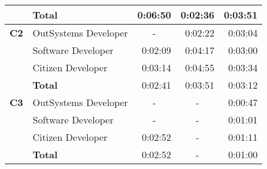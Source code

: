 \begin{table}[tb]
\begin{tabular}{llrcr}
                              & \textbf{Total}       & 0:06:50                                                           & \multicolumn{1}{r}{0:02:36}                                             & 0:03:51                                                       \\ \hline
    \textbf{C2}               & OutSystems Developer & \multicolumn{1}{c}{-}                                             & \multicolumn{1}{r}{0:02:22}                                             & 0:03:04                                                       \\
                              & Software Developer   & 0:02:09                                                           & \multicolumn{1}{r}{0:04:17}                                             & 0:03:00                                                       \\
                              & Citizen Developer    & 0:03:14                                                           & \multicolumn{1}{r}{0:04:55}                                             & 0:03:34                                                       \\
                              & \textbf{Total}       & 0:02:41                                                           & \multicolumn{1}{r}{0:03:51}                                             & 0:03:12                                                       \\ \hline
    \textbf{C3}               & OutSystems Developer & \multicolumn{1}{c}{-}                                             & -                                                                       & 0:00:47                                                       \\
                              & Software Developer   & \multicolumn{1}{c}{-}                                             & -                                                                       & 0:01:01                                                       \\
                              & Citizen Developer    & 0:02:52                                                           & -                                                                       & 0:01:11                                                       \\
                              & \textbf{Total}       & 0:02:52                                                           & -                                                                       & 0:01:00                                                       \\ \hline

\end{tabular}
\end{table}
